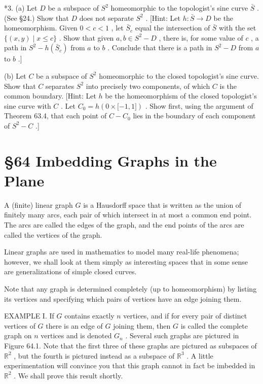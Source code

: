 *3. (a) Let \(D\) be a subspace of \({S}^{2}\) homeomorphic to the topologist’s sine curve \(\bar{S}\) . (See  \S 24.) Show that \(D\) does not separate \({S}^{2}\) . [Hint: Let \(h : \bar{S} \rightarrow  D\) be the homeomorphism. Given \(0 < c < 1\) , let \({\bar{S}}_{c}\) equal the intersection of \(\bar{S}\) with the set \(\{ \left( {x,y}\right)  \mid  x \leq  c\}\) . Show that given \(a,b \in  {S}^{2} - D\) , there is, for some value of \(c\) , a path in \({S}^{2} - h\left( {\bar{S}}_{c}\right)\) from \(a\) to \(b\) . Conclude that there is a path in \({S}^{2} - D\) from \(a\) to \(b\) .]

(b) Let \(C\) be a subspace of \({S}^{2}\) homeomorphic to the closed topologist’s sine curve. Show that \(C\) separates \({S}^{2}\) into precisely two components, of which \(C\) is the common boundary. [Hint: Let \(h\) be the homeomorphism of the closed topologist’s sine curve with \(C\) . Let \({C}_{0} = h\left( {0\times \lbrack  - 1,1\rbrack }\right)\) . Show first, using the argument of Theorem 63.4, that each point of \(C - {C}_{0}\) lies in the boundary of each component of \({S}^{2} - C\) .]

\section*{ \S 64 Imbedding Graphs in the Plane}

A (finite) linear graph \(G\) is a Hausdorff space that is written as the union of finitely many arcs, each pair of which intersect in at most a common end point. The arcs are called the edges of the graph, and the end points of the arcs are called the vertices of the graph.

Linear graphs are used in mathematics to model many real-life phenomena; however, we shall look at them simply as interesting spaces that in some sense are generalizations of simple closed curves.

Note that any graph is determined completely (up to homeomorphism) by listing its vertices and specifying which pairs of vertices have an edge joining them.

EXAMPLE I. If \(G\) contains exactly \(n\) vertices, and if for every pair of distinct vertices of \(G\) there is an edge of \(G\) joining them, then \(G\) is called the complete graph on \(n\) vertices and is denoted \({G}_{n}\) . Several such graphs are pictured in Figure 64.1. Note that the first three of these graphs are pictured as subspaces of \({\mathbb{R}}^{2}\) , but the fourth is pictured instead as a subspace of \({\mathbb{R}}^{3}\) . A little experimentation will convince you that this graph cannot in fact be imbedded in \({\mathbb{R}}^{2}\) . We shall prove this result shortly.

